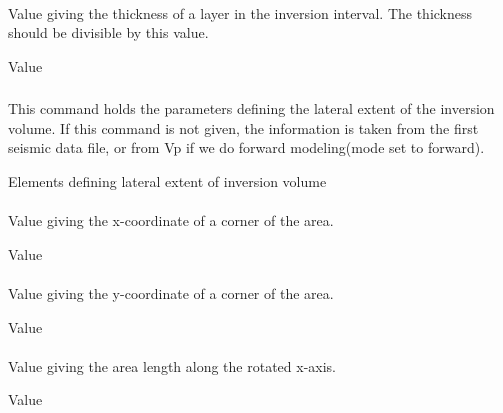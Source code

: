 \paragraph{}
 \slist
   \item \Description Value giving the thickness of a layer in the inversion interval. The thickness should be divisible by this value.
   \item \Argument Value
   \item \Default
 \elist

\subsubsection{}
 \slist
   \item \Description This command holds the parameters defining the lateral extent of the inversion volume. If this command is not given, the information is taken from the first seismic data file, or from Vp if we do forward modeling(mode set to forward).
   \item \Argument Elements defining lateral extent of inversion volume
   \item \Default
 \elist

\paragraph{}
 \slist
   \item \Description Value giving the x-coordinate of a corner of the area.
   \item \Argument Value
   \item \Default
 \elist

\paragraph{}
 \slist
   \item \Description Value giving the y-coordinate of a corner of the area.
   \item \Argument Value
   \item \Default
 \elist

\paragraph{}
 \slist
   \item \Description Value giving the area length along the rotated x-axis.
   \item \Argument Value
   \item \Default
 \elist

